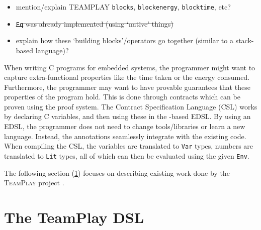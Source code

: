 \begin{itemize}
	\item mention/explain TEAMPLAY \texttt{blocks}, \texttt{blockenergy},
          \texttt{blocktime}, etc?
	\item \sout{\texttt{Eq} was already implemented (using `native' things)}
    \item explain how these `building blocks'/operators go together (similar to
    	  a stack-based language)?
\end{itemize}

When writing C programs for embedded systems, the programmer might want to capture extra-functional properties like the time taken or the energy consumed. Furthermore, the programmer may want to have provable guarantees that these properties of the program hold. This is done through contracts which can be proven using the \Idris proof system. The Contract Specification Language (CSL) works by declaring C variables, and then using these in the \Idris-based EDSL. By using an EDSL, the programmer does not need to change tools/libraries or learn a new language. Instead, the annotations seamlessly integrate with the existing code. When compiling the CSL, the variables are translated to \texttt{Var} types, numbers are translated to \texttt{Lit} types, all of which can then be evaluated using the given \texttt{Env}.
\\\par

The following section (\ref{des:tp-dsl}) focuses on describing existing work done by the \textsc{TeamPlay} project \cite{teamplay:d1.1}.


\section{The TeamPlay DSL}\label{des:tp-dsl}
